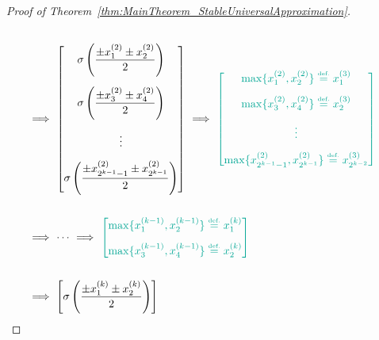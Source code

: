 \documentclass{article}
\numberwithin{equation}{section}
\theoremstyle{definition}
\newcommand{\eqdef}{\ensuremath{\stackrel{\mbox{\upshape\tiny def.}}{=}}}
\begin{document}
\begin{proof}[{Proof of Theorem~\ref{thm:MainTheorem_StableUniversalApproximation}}]
\begin{align}
{    }
    \nonumber
    \\
    \ &\Longrightarrow \
    \begin{bmatrix} 
        \displaystyle
        \sigma\left(\frac{\pm x_1^{(2)} \pm x_2^{(2)}}{2}\right) \\ 
        \vspace{-3pt} \\ 
        \displaystyle
        \sigma\left(\frac{\pm x_3^{(2)} \pm x_4^{(2)}}{2}\right) \\ 
        \vspace{-3pt} \\ \vdots \\ \vspace{-3pt} \\ 
        \displaystyle
        \sigma\left(\frac{\pm x_{2^{k-1}-1}^{(2)} \pm x_{2^{k-1}}^{(2)}}{2}\right)
    \end{bmatrix}
    \ \Longrightarrow \
    {\color{persiangreen}
    \begin{bmatrix} \max\{x_1^{(2)},x_2^{(2)}\} \eqdef x_1^{(3)} \\ \vspace{-3pt} \\ \max\{x_3^{(2)},x_4^{(2)}\} \eqdef x_2^{(3)} \\ \vspace{-3pt} \\ \vdots \\ \vspace{-3pt} \\ \max\{x_{2^{k-1}-1}^{(2)},x_{2^{k-1}}^{(2)}\} \eqdef x_{2^{k-2}}^{(3)} \end{bmatrix}
    }
    \nonumber
    \\
    \vspace{-3pt}
    \nonumber
    \\
    \ &\Longrightarrow \ \cdots \ \Longrightarrow \
    {\color{persiangreen}
    \begin{bmatrix} \max\{x_1^{(k-1)},x_2^{(k-1)}\} \eqdef x_1^{(k)} \\ \vspace{-3pt} \\ \max\{x_3^{(k-1)},x_4^{(k-1)}\} \eqdef x_2^{(k)} \end{bmatrix}
    }
    \nonumber
    \\
    \vspace{-3pt}
    \nonumber
    \\
    \ &\Longrightarrow \
    \begin{bmatrix} 
        \displaystyle
        \sigma\left(\frac{\pm x_1^{(k)} \pm x_2^{(k)}}{2} \right) 

\end{bmatrix}
\end{align}
\end{proof}
\end{document}
